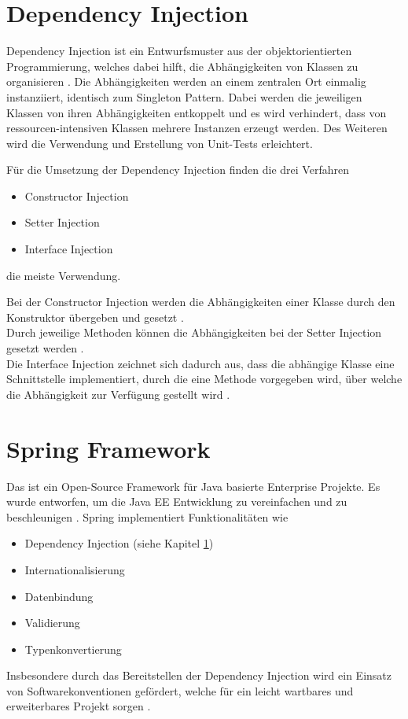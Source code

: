 \clearpage
 
\section{Dependency Injection} \label{dependencyinjection}
Dependency Injection ist ein Entwurfsmuster aus der objektorientierten Programmierung, welches dabei hilft, die Abhängigkeiten von Klassen zu organisieren \cite[S.~27]{dependency-book}. Die Abhängigkeiten werden an einem zentralen Ort einmalig instanziiert, identisch zum Singleton Pattern. Dabei werden die jeweiligen Klassen von ihren Abhängigkeiten entkoppelt und es wird verhindert, dass von ressourcen-intensiven Klassen mehrere Instanzen erzeugt werden. Des Weiteren wird die Verwendung und Erstellung von Unit-Tests erleichtert.

Für die Umsetzung der Dependency Injection finden die drei Verfahren
\begin{itemize}
	\item Constructor Injection
	\item Setter Injection
	\item Interface Injection
\end{itemize}
die meiste Verwendung.

Bei der Constructor Injection werden die Abhängigkeiten einer Klasse durch den Konstruktor übergeben und gesetzt \cite[S.~119]{dependency-book}.\\
Durch jeweilige Methoden können die Abhängigkeiten bei der Setter Injection gesetzt werden \cite[S.~120]{dependency-book}.\\
Die Interface Injection zeichnet sich dadurch aus, dass die abhängige Klasse eine Schnittstelle implementiert, durch die eine Methode vorgegeben wird, über welche die Abhängigkeit zur Verfügung gestellt wird \cite[S.~120]{dependency-book}.

\clearpage

\section{Spring Framework} \label{spring-framework}
Das  ist ein Open-Source Framework für Java basierte Enterprise Projekte. Es wurde entworfen, um die Java EE Entwicklung zu vereinfachen und zu beschleunigen \cite{spring-book-1}. Spring implementiert Funktionalitäten wie 
\begin{itemize}
	\item Dependency Injection (siehe Kapitel \ref{dependencyinjection})
	\item Internationalisierung 
	\item Datenbindung
	\item Validierung
	\item Typenkonvertierung
\end{itemize}
Insbesondere durch das Bereitstellen der Dependency Injection wird ein Einsatz von Softwarekonventionen gefördert, welche für ein leicht wartbares und erweiterbares Projekt sorgen \cite[S.~20]{spring-book-2}.

